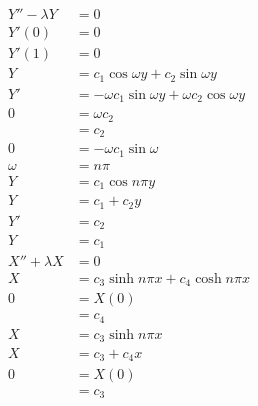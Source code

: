 \documentclass{article}
\begin{document}
\begin{align*}
  Y'' - \lambda Y & = 0                                                          \\
  Y'(0)           & = 0                                                          \\
  Y'(1)           & = 0                                                          \\
  Y               & = c_1 \cos \omega y + c_2 \sin \omega y                      \\
  Y'              & = -\omega c_1 \sin \omega y + \omega c_2 \cos \omega y       \\
  0               & = \omega c_2                                                 \\
                  & = c_2                                                        \\
  0               & = -\omega c_1 \sin \omega                                    \\
  \omega          & = n \pi                                                      \\
  Y               & = c_1 \cos n \pi y                                           \\
  Y               & = c_1 + c_2 y                                                \\
  Y'              & = c_2                                                        \\
  Y               & = c_1                                                        \\
  X'' + \lambda X & = 0                                                          \\
  X               & = c_3 \sinh n \pi x + c_4 \cosh n \pi x                      \\
  0               & = X(0)                                                       \\
                  & = c_4                                                        \\
  X               & = c_3 \sinh n \pi x                                          \\
  X               & = c_3 + c_4 x                                                \\
  0               & = X(0)                                                       \\
                  & = c_3                                                        \\

\end{align*}
\end{document}
